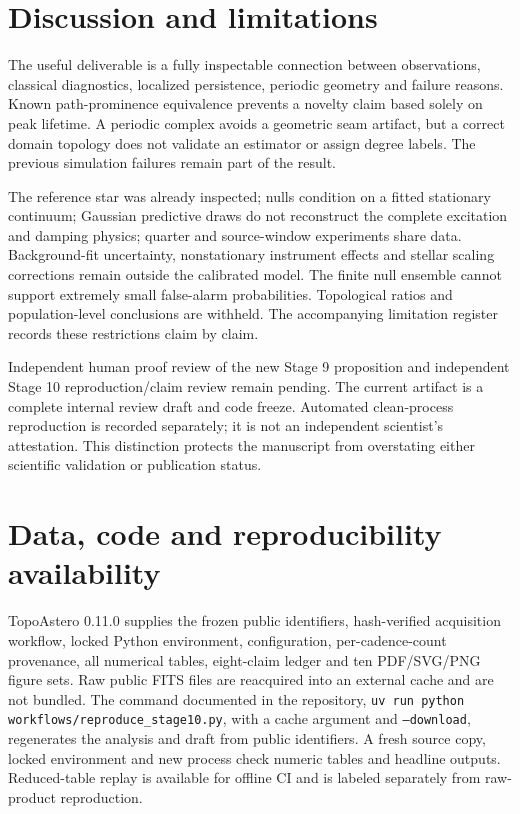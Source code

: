 \documentclass[11pt]{article}
\begin{document}


\section{Discussion and limitations}
The useful deliverable is a fully inspectable connection between observations,
classical diagnostics, localized persistence, periodic geometry and failure
reasons. Known path-prominence equivalence prevents a novelty claim based solely
on peak lifetime. A periodic complex avoids a geometric seam artifact, but a
correct domain topology does not validate an estimator or assign degree labels.
The previous simulation failures remain part of the result.

The reference star was already inspected; nulls condition on a fitted stationary
continuum; Gaussian predictive draws do not reconstruct the complete excitation
and damping physics; quarter and source-window experiments share data.
Background-fit uncertainty, nonstationary instrument effects and stellar scaling
corrections remain outside the calibrated model. The finite null ensemble cannot
support extremely small false-alarm probabilities. Topological ratios and
population-level conclusions are withheld. The accompanying limitation register
records these restrictions claim by claim.

Independent human proof review of the new Stage 9 proposition and independent
Stage 10 reproduction/claim review remain pending. The current artifact is a
complete internal review draft and code freeze. Automated clean-process
reproduction is recorded separately; it is not an independent scientist's
attestation. This distinction protects the manuscript from overstating either
scientific validation or publication status.

\section{Data, code and reproducibility availability}
TopoAstero 0.11.0 supplies the frozen public identifiers, hash-verified acquisition
workflow, locked Python environment, configuration, per-cadence-count provenance,
all numerical tables, eight-claim ledger and ten PDF/SVG/PNG figure sets.
Raw public FITS files are reacquired into an external cache and are not bundled.
The command documented in the repository,
\texttt{uv run python workflows/reproduce\_stage10.py}, with a cache argument
and \texttt{--download}, regenerates the analysis and draft from public identifiers.
A fresh source copy, locked environment and new process check numeric tables and
headline outputs. Reduced-table replay is available for offline CI and is labeled
separately from raw-product reproduction.
\end{document}
